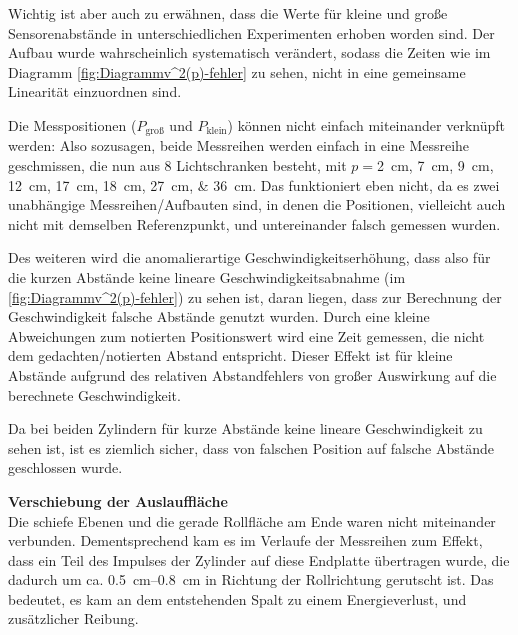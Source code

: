 Wichtig ist aber auch zu erwähnen, dass die Werte für kleine und große Sensorenabstände in unterschiedlichen Experimenten erhoben worden sind. Der Aufbau wurde wahrscheinlich systematisch verändert, sodass die Zeiten wie im Diagramm \cref{fig:Diagrammv^2(p)-fehler} zu sehen, nicht in eine gemeinsame Linearität einzuordnen sind.\par
Die Messpositionen (\(P_\text{groß}\) und \(P_\text{klein}\)) können nicht einfach miteinander verknüpft werden: Also sozusagen, beide Messreihen werden einfach in eine Messreihe geschmissen, die nun aus 8 Lichtschranken besteht, mit \(p=\)\qtylist[list-units=bracket]{2;7;9;12;17;18;27;36}{\cm}. Das funktioniert eben nicht, da es zwei unabhängige Messreihen/Aufbauten sind, in denen die Positionen, vielleicht auch nicht mit demselben Referenzpunkt, und untereinander falsch gemessen wurden.\par

Des weiteren wird die anomalierartige Geschwindigkeitserhöhung, dass also für die kurzen Abstände keine lineare Geschwindigkeitsabnahme (im \cref{fig:Diagrammv^2(p)-fehler}) zu sehen ist, daran liegen, dass zur Berechnung der Geschwindigkeit falsche Abstände genutzt wurden. Durch eine kleine Abweichungen zum notierten Positionswert wird eine Zeit gemessen, die nicht dem gedachten/notierten Abstand entspricht. Dieser Effekt ist für kleine Abstände aufgrund des relativen Abstandfehlers von großer Auswirkung auf die berechnete Geschwindigkeit.

Da bei beiden Zylindern für kurze Abstände keine lineare Geschwindigkeit zu sehen ist, ist es ziemlich sicher, dass von falschen Position auf falsche Abstände geschlossen wurde. \par


\vspace{0.5cm}
{\textbf{Verschiebung der Auslauffläche}}\\
Die schiefe Ebenen und die gerade Rollfläche am Ende waren nicht miteinander verbunden. Dementsprechend kam es im Verlaufe der Messreihen zum Effekt, dass ein Teil des Impulses der Zylinder auf diese Endplatte übertragen wurde, die dadurch um ca. \qtyrange{0.5}{0.8}{\cm} in Richtung der Rollrichtung gerutscht ist. Das bedeutet, es kam an dem entstehenden Spalt zu einem Energieverlust, und zusätzlicher Reibung. 

